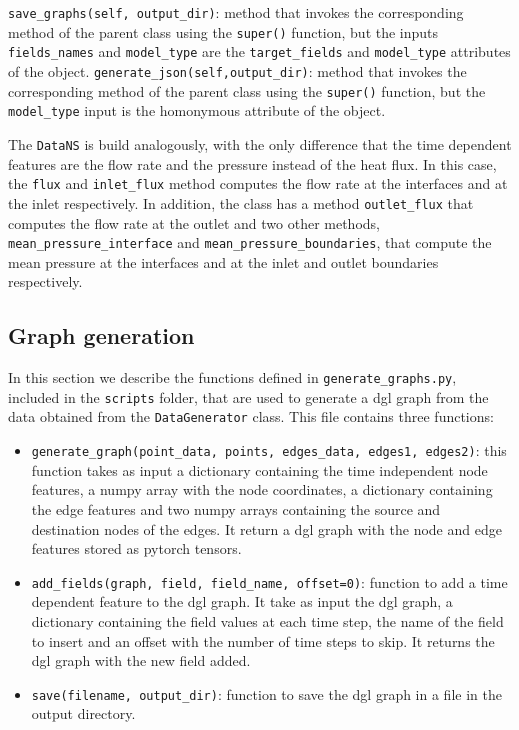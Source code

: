 \documentclass[11pt,a4paper]{article}
\begin{document}
 \texttt{save\_graphs(self, output\_dir)}: method that invokes the corresponding method of the parent class using the \texttt{super()} function, but the inputs \texttt{fields\_names} and \texttt{model\_type} are the \texttt{target\_fields} and \texttt{model\_type} attributes of the object.
 \texttt{generate\_json(self,output\_dir)}: method that invokes the corresponding method of the parent class using the \texttt{super()} function, but the \texttt{model\_type} input is the homonymous attribute of the object.

The \texttt{DataNS} is build analogously, with the only difference that the time dependent features are the flow rate and the pressure instead of the heat flux. In this case, the \texttt{flux} and \texttt{inlet\_flux} method computes the flow rate at the interfaces and at the inlet respectively. In addition, the class has a method \texttt{outlet\_flux} that computes the flow rate at the outlet and two other methods, \texttt{mean\_pressure\_interface} and \texttt{mean\_pressure\_boundaries}, that compute the mean pressure at the interfaces and at the inlet and outlet boundaries respectively.

\subsection{Graph generation}

In this section we describe the functions defined in \texttt{generate\_graphs.py}, included in the \texttt{scripts} folder, that are used to generate a dgl graph from the data obtained from the \texttt{DataGenerator} class. This file contains three functions: 
\begin{itemize}
    \item \texttt{generate\_graph(point\_data, points, edges\_data, edges1, edges2)}: this function takes as input a dictionary containing the time independent node features, a numpy array with the node coordinates, a dictionary containing the edge features and two numpy arrays containing the source and destination nodes of the edges. It return a dgl graph with the node and edge features stored as pytorch tensors.
    \item \texttt{add\_fields(graph, field, field\_name, offset=0)}: function to add a time dependent feature to the dgl graph. It take as input the dgl graph, a dictionary containing the field values at each time step, the name of the field to insert and an offset with the number of time steps to skip. It returns the dgl graph with the new field added.
    \item \texttt{save(filename, output\_dir)}: function to save the dgl graph in a file in the output directory.
\end{itemize}
\end{document}
